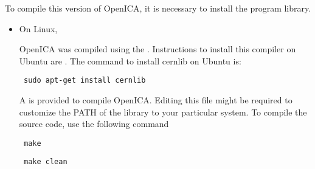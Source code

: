          To compile this version of OpenICA, it is necessary to install the  program library.

         \begin{itemize}

           \item On Linux, 

           OpenICA was compiled using the . Instructions to install this compiler on Ubuntu are . The command to install cernlib on Ubuntu is: \begin{verbatim} sudo apt-get install cernlib \end{verbatim}

           A  is provided to compile OpenICA. Editing this file might be required to customize the PATH of the library to your particular system. 
           To compile the source code, use the following command \begin{verbatim} make \end{verbatim} \begin{verbatim} make clean \end{verbatim}



         \end{itemize}
         

